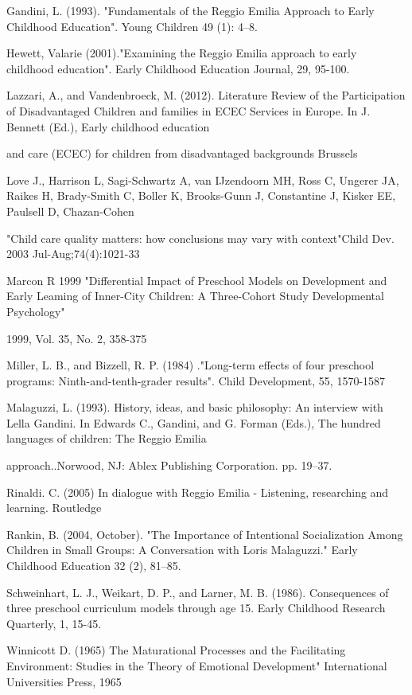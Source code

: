 \documentclass[12pt]{article}
\begin{document}
Gandini, L. (1993). "Fundamentals of the Reggio Emilia Approach to Early
Childhood Education". Young Children 49 (1): 4--8.

Hewett, Valarie (2001)."Examining the Reggio Emilia approach to early
childhood education". Early Childhood Education Journal, 29, 95-100.

Lazzari, A., and Vandenbroeck, M. (2012). Literature Review of the
Participation of Disadvantaged Children and families in ECEC Services in
Europe. In J. Bennett (Ed.), Early childhood education 

and care (ECEC) for children from disadvantaged backgrounds Brussels

Love J., Harrison L, Sagi-Schwartz A, van IJzendoorn MH, Ross C, Ungerer JA,
Raikes H, Brady-Smith C, Boller K, Brooks-Gunn J, Constantine J, Kisker EE,
Paulsell D, Chazan-Cohen

"Child care quality matters: how conclusions may vary with context"Child
Dev. 2003 Jul-Aug;74(4):1021-33

Marcon R 1999 "Differential Impact of Preschool Models on Development and
Early Leaming of Inner-City Children: A Three-Cohort Study Developmental
Psychology"

1999, Vol. 35, No. 2, 358-375

Miller, L. B., and Bizzell, R. P. (1984) ."Long-term effects of four
preschool programs: Ninth-and-tenth-grader results". Child Development, 55,
1570-1587

Malaguzzi, L. (1993). History, ideas, and basic philosophy: An interview
with Lella Gandini. In Edwards C., Gandini, and G. Forman (Eds.), The
hundred languages of children: The Reggio Emilia

approach..Norwood, NJ: Ablex Publishing Corporation. pp. 19--37.

Rinaldi. C. (2005) In dialogue with Reggio Emilia - Listening, researching
and learning. Routledge 

Rankin, B. (2004, October). "The Importance of Intentional Socialization
Among Children in Small Groups: A Conversation with Loris Malaguzzi." Early
Childhood Education 32 (2), 81--85.

Schweinhart, L. J., Weikart, D. P., and Larner, M. B. (1986). Consequences
of three preschool curriculum models through age 15. Early Childhood
Research Quarterly, 1, 15-45.

Winnicott D. (1965) The Maturational Processes and the Facilitating
Environment: Studies in the Theory of Emotional Development" International
Universities Press, 1965
\end{document}
